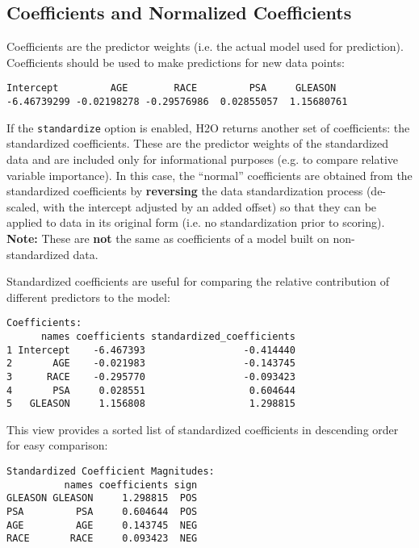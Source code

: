 \subsection{Coefficients and Normalized Coefficients}

Coefficients are the predictor weights (i.e. the actual model used for prediction).  Coefficients should be used to
make predictions for new data points:


\begin{lstlisting}[style=output]
  Intercept         AGE        RACE         PSA     GLEASON 
-6.46739299 -0.02198278 -0.29576986  0.02855057  1.15680761 
\end{lstlisting}

If the \texttt{standardize} option is enabled, H2O returns another set of coefficients: the standardized
coefficients. These are the predictor weights of the standardized data and are included only for informational
purposes (e.g. to compare relative variable importance). In this case, the ``normal'' coefficients are obtained
from the standardized coefficients by \textbf{reversing} the data standardization process (de-scaled, with the
intercept adjusted by an added offset) so that they can be applied to data in its original form (i.e. no
standardization prior to scoring). \textbf{Note:} These are \textbf{not} the same as coefficients of a model built
on non-standardized data.

Standardized coefficients are useful for comparing the relative contribution of different predictors to the
model:


\begin{lstlisting}[style=output]
Coefficients:
      names coefficients standardized_coefficients
1 Intercept    -6.467393                 -0.414440
2       AGE    -0.021983                 -0.143745
3      RACE    -0.295770                 -0.093423
4       PSA     0.028551                  0.604644
5   GLEASON     1.156808                  1.298815
\end{lstlisting}

This view provides a sorted list of standardized coefficients in descending order for easy comparison:


\begin{lstlisting}[style=output]
Standardized Coefficient Magnitudes:
          names coefficients sign
GLEASON GLEASON     1.298815  POS
PSA         PSA     0.604644  POS
AGE         AGE     0.143745  NEG
RACE       RACE     0.093423  NEG
\end{lstlisting}

